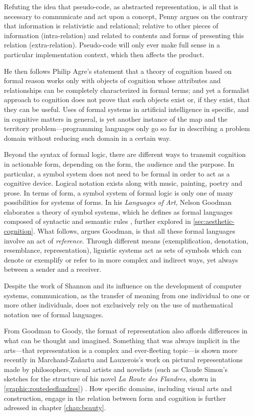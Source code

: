 Refuting the idea that pseudo-code, as abstracted representation, is all that is necessary to communicate and act upon a concept, Penny  argues on the contrary that information is relativistic and relational; relative to other pieces of information (intra-relation) and related to contents and forms of presenting this relation (extra-relation). Pseudo-code will only ever make full sense in a particular implementation context, which then affects the product.

He then follows Philip Agre's statement that a theory of cognition based on formal reason works only with objects of cognition whose attributes and relationships can be completely characterized in formal terms; and yet a formalist approach to cognition does not prove that such objects exist or, if they exist, that they can be useful. Uses of formal systems in artificial intelligence in specific, and in cognitive matters in general, is yet another instance of the map and the territory problem—programming languages only go so far in describing a problem domain without reducing such domain in a certain way.

Beyond the syntax of formal logic, there are different ways to transmit cognition in actionable form, depending on the form, the audience and the purpose. In particular, a symbol system does not need to be formal in order to act as a cognitive device. Logical notation exists along with music, painting, poetry and prose. In terms of form, a symbol system of formal logic is only one of many possibilities for systems of forms. In his \emph{Languages of Art}, Nelson Goodman elaborates a theory of symbol systems, which he defines as formal languages composed of syntactic and semantic rules \citep{goodman_languages_1976}, further explored in \autoref{sec:aesthetic-cognition}. What follows, argues Goodman, is that all these formal languages involve an act of \emph{reference}. Through different means (exemplification, denotation, resemblance, representation), liguistic systems act as sets of symbols which can denote or exemplify or refer to in more complex and indirect ways, yet always between a sender and a receiver.

Despite the work of Shannon \citep{shannon_mathematical_2001} and its influence on the development of computer systems, communication, as the transfer of meaning from one individual to one or more other individuals, does not exclusively rely on the use of mathematical notation use of formal languages.

From Goodman to Goody, the format of representation also affords differences in what can be thought and imagined. Something that was always implicit in the arts—that representation is a complex and ever-fleeting topic—is shown more recently in Marchand-Zañartu and Lauxerois's work on pictural representations made by philosophers, visual artists and novelists (such as Claude Simon's sketches for the structure of his novel \emph{La Route des Flandres}, shown in \autoref{graphic:routedesflandres}) \citep{marchand-zanartu_32_2022}. How specific domains, including  visual arts and construction, engage in the relation between form and cognition is further adressed in chapter \autoref{chap:beauty}.

